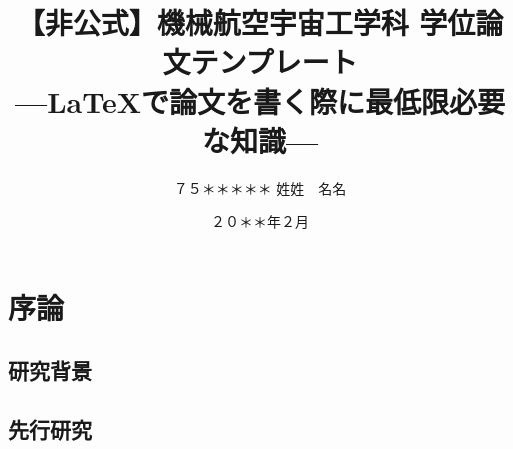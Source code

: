 \documentclass[
    openany,oneside,
    paper=a4paper,      %
    book,               %
    fontsize=12pt,      %
    jafontsize=12pt,    %
    head_space=33mm,    %
    foot_space=30mm,    %
    gutter=25mm,        %
    fore-edge=10mm      %
    ]{jlreq}            %
\begin{document}
\frontmatter



\title{【非公式】機械航空宇宙工学科 学位論文テンプレート\\ ---\LaTeX で論文を書く際に最低限必要な知識---}

\date{２０＊＊年２月}




\author{%
７５＊＊＊＊＊
\zw%
姓姓　名名
} %

\makecover

\pagestyle{empty}
\def\thepage{}
\tableofcontents

\signary

\lipsum[1-8]


\mainmatter
\newpage
\setcounter{page}{0}

\chapter{序論}
\label{ch:introduction}

\lipsum[1]

\section{研究背景}
\label{sec:background}

\lipsum[1-8]

\section{先行研究}
\label{sec:previous}
\end{document}
